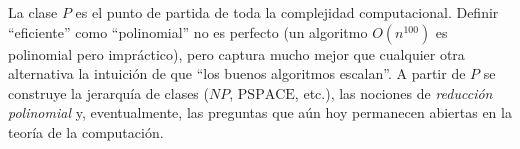 \documentclass[11pt,a4paper]{article}
\theoremstyle{definicion}
\begin{document}
\begin{intuicion}
La clase $P$ es el punto de partida de toda la complejidad computacional. Definir ``eficiente'' como ``polinomial'' no es perfecto (un algoritmo $O(n^{100})$ es polinomial pero impráctico), pero captura mucho mejor que cualquier otra alternativa la intuición de que ``los buenos algoritmos escalan''. A partir de $P$ se construye la jerarquía de clases ($NP$, $\mathrm{PSPACE}$, etc.), las nociones de \emph{reducción polinomial} y, eventualmente, las preguntas que aún hoy permanecen abiertas en la teoría de la computación.
\end{intuicion}
\end{document}
